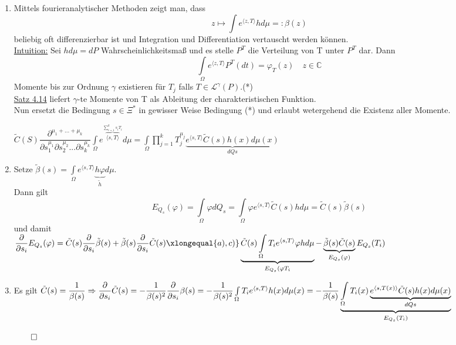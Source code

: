 \documentclass[german,10pt,oneside, fleqn, a4paper]{article}
\newcommand {\C}	{\mathbb{C}}
\newcommand{\Ra}	{\Rightarrow}
\newcommand{\sm}[2][\infty]{\sum\limits_{#2}^{#1}}
\newcommand{\QED}{\begin{flushright}$\qed$\end{flushright}}
\newcommand{\mc}[1]{\mathcal{#1}}
\newcommand{\lp}[1]{\mc{L}^{#1}}
\newcommand{\1}[1]{1_{#1}}
\newcommand{\2}[1]{\1{\brac{#1}}}
\begin{document}
\begin{enumerate}[label=(\alph*)]
\item Mittels fourieranalytischer Methoden zeigt man, dass \[
z\mapsto\int e^{\langle z,T\rangle} hd\mu=:\beta(z)\]
beliebig oft differenzierbar ist und Integration und Differentiation vertauscht werden können.\\

\underline{Intuition:} Sei $hd\mu=dP$ Wahrscheinlichkeitsmaß und es stelle $P^T$ die Verteilung von T unter $P^T$ dar. Dann \[
\int\limits_\Omega e^{\langle z,T\rangle}P^T(dt)=\varphi_T(z)\quad z\in\C\]
Momente bis zur Ordnung $\gamma$ existieren für $T_j$ falls $T\in\lp{\gamma}(P)$.\hfill(*)\\
\hyperref[4.14]{Satz 4.14} liefert $\gamma$-te Momente von T als Ableitung der charakteristischen Funktion.\\
Nun ersetzt die Bedingung $s\in\Xi^*$ in gewisser Weise Bedingung (*) und erlaubt wetergehend die Existenz aller Momente.

$\tilde{C}(S)\dfrac{\partial^{\mu_1+...+\mu_k}}{{\partial s_1^{\mu_1}\partial s_2^{\mu_2}...\partial s_k^{\mu_k}}}\int\limits_\Omega e^{\overbrace{\langle s,T\rangle}^{\sm[k]{i=1}s_iT_i}}d\mu=\int\limits_\Omega\prod\limits_{j=1}^kT_j^{\mu_j}\underbrace{e^{\langle s,T\rangle}\tilde{C}(s)h(x)d\mu(x)}_{dQs}$
\item Setze $\tilde{\beta}(s)=\int\limits_\Omega e^{\langle s,T\rangle}\underbrace{h\varphi}_{\tilde{h}}d\mu$.\\
Dann gilt \[
E_{Q_s}(\varphi)=\int\limits_\Omega\varphi dQ_s=\int\limits_\Omega\varphi e^{\langle s,T\rangle}\tilde{C}(s)hd\mu=\tilde{C}(s)\tilde{\beta}(s)\]
und damit\\
$\dfrac{\partial}{\partial s_i} E_{Q_s}(\varphi)=\tilde{C}(s)\dfrac{\partial}{\partial s_i}\tilde\beta(s)+\tilde\beta(s)\dfrac{\partial}{\partial s_i}\tilde C(s)\\
\xlongequal{a),c)}\underbrace{\tilde{C}(s)\int\limits_\Omega T_ie^{\langle s,T\rangle}\varphi hd\mu}_{E_{Q_s}(\varphi T_i}-\underbrace{\tilde\beta(s)\tilde C(s)}_{E_{Q_s}(\varphi)}E_{Q_s}(T_i)$
\item Es gilt $\tilde{C}(s)=\dfrac{1}{\beta(s)}\\
\Ra\dfrac{\partial}{\partial s_i}\tilde{C}(s)=-\dfrac{1}{\beta (s)^2}\dfrac{\partial}{\partial s_i}\beta(s)=-\dfrac{1}{\beta(s)^2}\int\limits_\Omega T_ie^{\langle s,T\rangle}h(x)d\mu(x)\\
=-\dfrac{1}{\beta(s)}\underbrace{\int\limits_\Omega T_i(x)\underbrace{e^{\langle s,T(x)\rangle}\tilde{C}(s)h(x)d\mu(x)}_{dQs}}_{E_{Q_s}(T_i)}$\QED

\end{enumerate}
\end{document}
